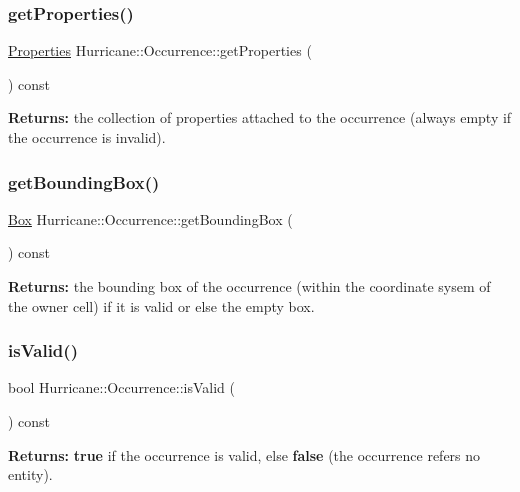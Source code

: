 \subsubsection{\texorpdfstring{get\+Properties()}{getProperties()}}
{\footnotesize\ttfamily \mbox{\hyperlink{namespaceHurricane_afd7bca6dad4be54b7c03b0463e6c0004}{Properties}} Hurricane\+::\+Occurrence\+::get\+Properties (\begin{DoxyParamCaption}{ }\end{DoxyParamCaption}) const}

{\bfseries Returns\+:} the collection of properties attached to the occurrence (always empty if the occurrence is invalid). \mbox{\label{classHurricane_1_1Occurrence_a6c808dba6637c716075e0887c5f25518}} 
\subsubsection{\texorpdfstring{get\+Bounding\+Box()}{getBoundingBox()}}
{\footnotesize\ttfamily \mbox{\hyperlink{classHurricane_1_1Box}{Box}} Hurricane\+::\+Occurrence\+::get\+Bounding\+Box (\begin{DoxyParamCaption}{ }\end{DoxyParamCaption}) const}

{\bfseries Returns\+:} the bounding box of the occurrence (within the coordinate sysem of the owner cell) if it is valid or else the empty box. \mbox{\label{classHurricane_1_1Occurrence_ade38e5da7eb5d8701cd3a8f252cdf62f}} 
\subsubsection{\texorpdfstring{is\+Valid()}{isValid()}}
{\footnotesize\ttfamily bool Hurricane\+::\+Occurrence\+::is\+Valid (\begin{DoxyParamCaption}{ }\end{DoxyParamCaption}) const\hspace{0.3cm}{\ttfamily [inline]}}

{\bfseries Returns\+:} {\bfseries true} if the occurrence is valid, else {\bfseries false} (the occurrence refers no entity). \mbox{\label{classHurricane_1_1Occurrence_a0c1c6cfdf47f33166d108e2311d74e48}} 
